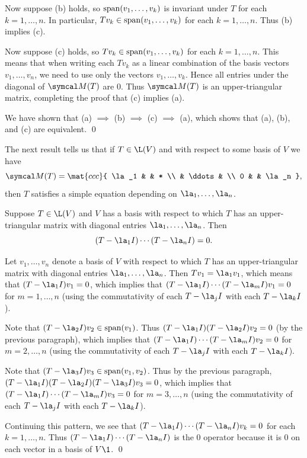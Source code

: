 Now suppose (b) holds, so $\operatorname{span}(v_1, \dots, v_k)$ is invariant under $T$ for each \mbox{$k = 1, \dots, n$}. In particular,
$Tv_k \in \operatorname{span}(v_1, \dots, v_k)$ for each $k = 1, \dots, n$. Thus (b) implies (c).

Now suppose (c) holds, so $Tv_k \in \operatorname{span}(v_1, \dots, v_k)$ for each $k = 1, \dots, n$. This means that when writing each $Tv_k$ as a linear combination of the basis vectors $v_1, \ldots, v_n$, we need to use only the vectors $v_1, \ldots, v_k$. Hence all entries under the diagonal of $\M(T)$ are $0$. Thus $\M(T)$ is an upper-triangular matrix, completing the proof that (c) implies (a).

We have shown that (a) $\implies$ (b) $\implies$ (c) $\implies$ (a), which shows that (a), (b), and (c) are equivalent.
\qed

The next result tells us that if $T \in \L(V)$ and with respect to some basis of $V$ we have
\[
\M(T) = \mat{ccc}{
\la_1 & & * \\
&  \ddots & \\
0 & & \la_n },
\]
then $T$ satisfies a simple equation depending on $\la_1, \ldots, \la_n$.

{Suppose $T \in \L(V)$ and $V$ has a basis with respect to which $T$  has an upper-triangular matrix with diagonal entries
$\la_1, \ldots, \la_n$. Then
\[
(T-\la_1 I) \cdots (T - \la_n I) = 0.
\]}

\proof
Let $v_1, \ldots, v_n$ denote a basis of $V$ with respect to which $T$ has an upper-triangular matrix with diagonal entries
$\la_1, \ldots, \la_n$. Then $Tv_1 = \la_1 v_1$, which means that $(T-\la_1 I)v_1 = 0$, which implies that
$(T-\la_1 I) \cdots (T - \la_m I) v_1 = 0$ for $m=1, \ldots, n$ (using the commutativity of each $T - \la_j I$ with each $T - \la_k I$).

Note that $(T - \la_2 I)v_2 \in \Span(v_1)$. Thus $(T - \la_1 I)(T - \la_2 I)v_2 = 0$ (by the previous paragraph), which implies that
$(T-\la_1 I) \cdots (T - \la_m I) v_2 = 0$ for $m=2, \ldots, n$ (using the commutativity of each $T - \la_j I$ with each $T - \la_k I$).

Note that $(T - \la_3 I)v_3 \in \Span(v_1, v_2)$. Thus by the previous paragraph, $(T - \la_1 I)(T - \la_2 I)(T - \la_3 I) v_3 = 0$, which implies that $(T-\la_1 I) \cdots (T - \la_m I) v_3 = 0$ for $m=3, \ldots, n$ (using the commutativity of each $T - \la_j I$ with each
$T - \la_k I$).

Continuing this pattern, we see that $(T-\la_1 I) \cdots (T - \la_n I)v_k = 0$ for each $k = 1, \ldots, n$. Thus $(T-\la_1 I) \cdots (T - \la_n I)$ is the $0$ operator because it is $0$ on each vector in a basis of $V\1$.
\qed

